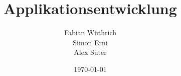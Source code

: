 \titlehead{Hochschule Luzern \\ 
	Technik \& Architektur}
\subject{Zusammenfassung}
\title{Applikationsentwicklung}
\subtitle{}
\author{Fabian Wüthrich \\ 
	Simon Erni \\ 
	Alex Suter}
\date{\today}

\maketitle